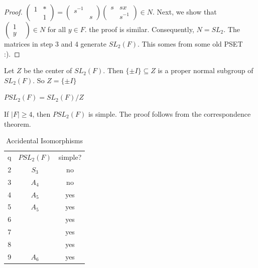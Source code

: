 \documentclass{article}
\begin{document}
\begin{proof}
$\begin{pmatrix}
1&*\\&1
\end{pmatrix}=\begin{pmatrix}
s^{-1}&\\&s
\end{pmatrix}
\begin{pmatrix}
s&sx\\&s^{-1}
\end{pmatrix}\in N$. Next, we show that $\begin{pmatrix}
1&\\y&
\end{pmatrix}\in N$ for all $y\in F$. the proof is similar. Consequently, $N=SL_2$. The matrices in step 3 and 4 generate $SL_2(F)$. This somes from some old PSET :).
\end{proof}
Let $Z$ be the center of $SL_2(F)$. Then $\{\pm I\}\subseteq Z$ is a proper normal subgroup of $SL_2(F)$. So $Z=\{\pm I\}$
\begin{definition}
$PSL_2(F)=SL_2(F)/Z$
\end{definition}
\begin{corollary}
If $|F|\geq 4$, then $PSL_2(F)$ is simple. The proof follows from the correspondence theorem.
\end{corollary}
\begin{table}[h]
    \centering
    \begin{tabular}{c|c|c}
        q & $PSL_2(F)$ & simple? \\
        2 & $S_3$ & no \\
        3 & $A_4$ & no \\
        4 & $A_5$ & yes \\
        5 & $A_5$ & yes \\
        6 & & yes \\
        7 & & yes \\
        8 & & yes \\
        9 & $A_6$ & yes 
    \end{tabular}
    \caption{Accidental Isomorphisms}
    \label{tab:my_label}
\end{table}
\end{document}
